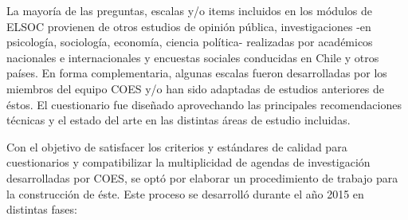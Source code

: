 \documentclass[
  12pt,
]{article}
\begin{document}
La mayoría de las preguntas, escalas y/o items incluidos en los módulos de ELSOC provienen de otros estudios de opinión pública, investigaciones -en psicología, sociología, economía, ciencia política- realizadas por académicos nacionales e internacionales y encuestas sociales conducidas en Chile y otros países. En forma complementaria, algunas escalas fueron desarrolladas por los miembros del equipo COES y/o han sido adaptadas de estudios anteriores de éstos. El cuestionario fue diseñado aprovechando las principales recomendaciones técnicas y el estado del arte en las distintas áreas de estudio incluidas.

Con el objetivo de satisfacer los criterios y estándares de calidad para cuestionarios y compatibilizar la multiplicidad de agendas de investigación desarrolladas por COES, se optó por elaborar un procedimiento de trabajo para la construcción de éste. Este proceso se desarrolló durante el año 2015 en distintas fases:
\end{document}
